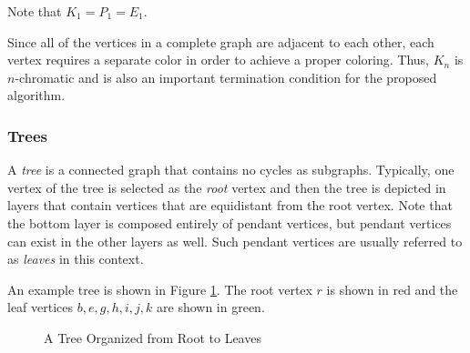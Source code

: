 Note that \(K_1=P_1=E_1\).

Since all of the vertices in a complete graph are adjacent to each other, each vertex requires a separate color in
order to achieve a proper coloring.  Thus, \(K_n\) is \(n\)-chromatic and is also an important termination
condition for the proposed algorithm.

\subsubsection{Trees}

A \emph{tree} is a connected graph that contains no cycles as subgraphs.  Typically, one vertex of the tree is
selected as the \emph{root} vertex and then the tree is depicted in layers that contain vertices that are
equidistant from the root vertex.  Note that the bottom layer is composed entirely of pendant vertices, but pendant
vertices can exist in the other layers as well.  Such pendant vertices are usually referred to as \emph{leaves} in
this context.

An example tree is shown in Figure \ref{fig:tree}.  The root vertex \(r\) is shown in red and the leaf vertices
\(b,e,g,h,i,j,k\) are shown in green.

\begin{figure}
  \label{fig:tree}
  \begin{center}
  \end{center}
  \caption{A Tree Organized from Root to Leaves}
\end{figure}


